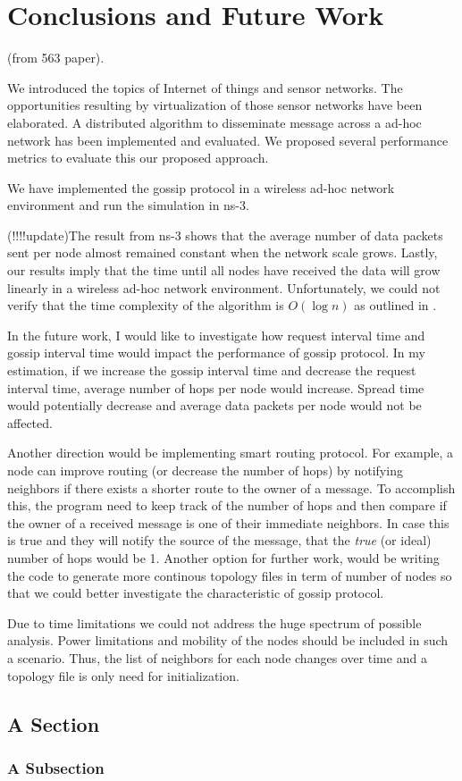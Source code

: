 \chapter{Conclusions and Future Work}

(from 563 paper).

We introduced the topics of Internet of things and sensor networks. The opportunities resulting by virtualization of those sensor networks have been elaborated. A distributed algorithm to disseminate message across a ad-hoc network has been implemented and evaluated. We proposed several performance metrics to evaluate this our proposed approach.

We have implemented the gossip protocol in a wireless ad-hoc network environment and run the simulation in ns-3. 

(!!!!update)The result from ns-3 shows that the average number of data packets sent per node almost remained constant when the network scale grows. Lastly, our results imply that the time until all nodes have received the data will grow linearly in a wireless ad-hoc network environment. Unfortunately, we could not verify that the time complexity of the algorithm is $O(\log n)$ as outlined in \cite{gossip}.

In the future work, I would like to investigate how request interval time and gossip interval time would impact the performance of gossip protocol. In my estimation, if we increase the gossip interval time and decrease the request interval time, average number of hops per node would increase. Spread time would potentially decrease and average data packets per node would not be affected.

Another direction would be implementing smart routing protocol. For example, a node can improve routing (or decrease the number of hops) by notifying neighbors if there exists a shorter route to the owner of a message. To accomplish this, the program need to keep track of the number of hops and then compare if the owner of a received message is one of their immediate neighbors. In case this is true and they will notify the source of the message, that the \textit{true} (or ideal) number of hops would be 1. Another option for further work, would be writing the code to generate more continous topology files in term of number of nodes so that we could better investigate the characteristic of gossip protocol.

Due to time limitations we could not address the huge spectrum of possible analysis. Power limitations and mobility of the nodes should be included in such a scenario. Thus, the list of neighbors for each node changes over time and a topology file is only need for initialization.

\section{A Section}

\subsection{A Subsection}
